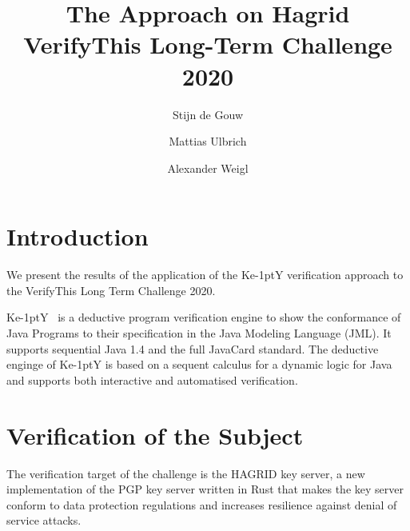 \documentclass{llncs}
\title{The \KeY Approach on Hagrid
  \\{\small VerifyThis Long-Term Challenge 2020 }}
\author{ Stijn de Gouw \and Mattias Ulbrich \and Alexander Weigl }
\institute{Open University \and Karlsruhe Institute of Technology}
\newcommand{\KeY}{Ke\kern-1ptY\xspace}
\begin{document}
\maketitle

\section{Introduction}

We present the results of the application of the \KeY verification
approach to the VerifyThis Long Term Challenge 2020. 



\KeY~\cite{KeyBook2} is a deductive program verification engine to
show the conformance of Java Programs to their specification in the
Java Modeling Language (JML). It supports sequential Java 1.4 and the
full JavaCard  standard.
%
The deductive enginge of \KeY is based on a sequent calculus for a
dynamic logic for Java and supports both interactive and automatised
verification.


\section{Verification of the Subject}
The verification target of the challenge is the HAGRID key server, a
new implementation of the PGP key server written in Rust that makes
the key server conform to data protection regulations and increases
resilience against denial of service attacks.
\end{document}
